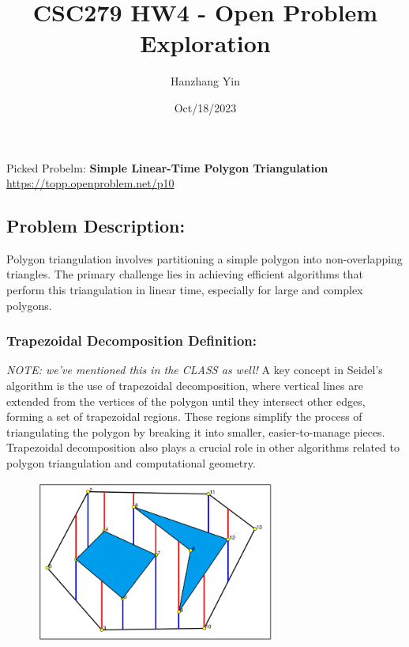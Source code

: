 \documentclass{article}
\title{CSC279 HW4 - Open Problem Exploration}
\author{Hanzhang Yin}
\date{Oct/18/2023}
\begin{document}
\maketitle

\noindent Picked Probelm: \textbf{Simple Linear-Time Polygon Triangulation} 
\\
\url{https://topp.openproblem.net/p10}

\subsection*{Problem Description:}
Polygon triangulation involves partitioning a simple polygon into non-overlapping triangles.
The primary challenge lies in achieving efficient algorithms that perform this triangulation in linear time, especially for large and complex polygons.

\subsubsection*{Trapezoidal Decomposition Definition: }
\textit{NOTE: we've mentioned this in the CLASS as well!}
A key concept in Seidel's algorithm is the use of trapezoidal decomposition, where vertical lines are extended from the vertices of the polygon until they intersect other edges, forming a set of trapezoidal regions. These regions simplify the process of triangulating the polygon by breaking it into smaller, easier-to-manage pieces. Trapezoidal decomposition also plays a crucial role in other algorithms related to polygon triangulation and computational geometry.
\begin{figure}[h]
    \centering
    \includegraphics[width=0.7\textwidth]{TrapDecomp.png}
    \label{fig:model}
\end{figure}
\end{document}
